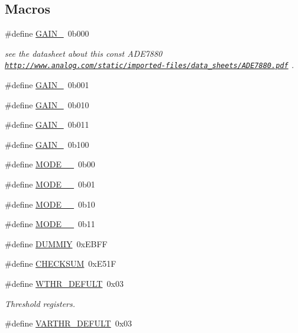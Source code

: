 \subsection*{Macros}
\begin{DoxyCompactItemize}
\item 
\#define \hyperlink{a00036_a3c686a06cc9d837e73b259bcc054217e}{G\-A\-I\-N\-\_}~0b000
\begin{DoxyCompactList}\small\item\em see the datasheet about this const A\-D\-E7880 \href{http://www.analog.com/static/imported-files/data_sheets/ADE7880.pdf}{\tt http\-://www.\-analog.\-com/static/imported-\/files/data\-\_\-sheets/\-A\-D\-E7880.\-pdf} . \end{DoxyCompactList}\item 
\#define \hyperlink{a00036_a7ce9d36acd86736019606c4d928b7aad}{G\-A\-I\-N\-\_}~0b001
\item 
\#define \hyperlink{a00036_a8720f417f5b56154123f813b2a011c46}{G\-A\-I\-N\-\_}~0b010
\item 
\#define \hyperlink{a00036_a9b90b27f7ed8ebac69dd8b82df741872}{G\-A\-I\-N\-\_}~0b011
\item 
\#define \hyperlink{a00036_a849e708719d768ea90ada6f58eea52a8}{G\-A\-I\-N\-\_}~0b100
\item 
\#define \hyperlink{a00036_ab25bd124940aca39914f363b92cabb95}{M\-O\-D\-E\-\_\-\_}~0b00
\item 
\#define \hyperlink{a00036_aa4b4d2ec825ed4a85181717901110ff7}{M\-O\-D\-E\-\_\-\_}~0b01
\item 
\#define \hyperlink{a00036_a2f363ec07f38ba94cc1d74172233d801}{M\-O\-D\-E\-\_\-\_}~0b10
\item 
\#define \hyperlink{a00036_abfccf6bbc27bb259fc6233bc9ee591e2}{M\-O\-D\-E\-\_\-\_}~0b11
\item 
\#define \hyperlink{a00036_aa2594962ecec33d43f5b8dea993068ca}{D\-U\-M\-M\-I\-Y}~0x\-E\-B\-F\-F
\item 
\#define \hyperlink{a00036_a9886586c91a412164c69eb0270d2875e}{C\-H\-E\-C\-K\-S\-U\-M}~0x\-E51\-F
\item 
\#define \hyperlink{a00036_a54a78cc890aa0300e82a9de239ebc5a5}{W\-T\-H\-R\-\_\-\-D\-E\-F\-U\-L\-T}~0x03
\begin{DoxyCompactList}\small\item\em Threshold registers. \end{DoxyCompactList}\item 
\#define \hyperlink{a00036_a105c1723ae41d790579de1a93641abea}{V\-A\-R\-T\-H\-R\-\_\-\-D\-E\-F\-U\-L\-T}~0x03

\end{DoxyCompactItemize}
